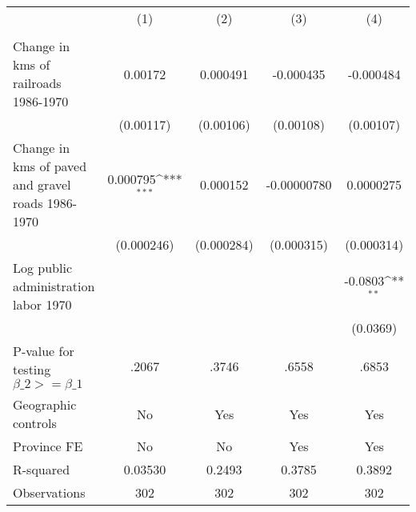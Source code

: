 {
\def\sym#1{\ifmmode^{#1}\else\(^{#1}\)\fi}
\begin{tabular}{l*{4}{c}}
\hline\hline
                &\multicolumn{1}{c}{(1)}&\multicolumn{1}{c}{(2)}&\multicolumn{1}{c}{(3)}&\multicolumn{1}{c}{(4)}\\
                &\multicolumn{1}{c}{}&\multicolumn{1}{c}{}&\multicolumn{1}{c}{}&\multicolumn{1}{c}{}\\
\hline
Change in kms of railroads 1986-1970&  0.00172         & 0.000491         &-0.000435         &-0.000484         \\
                &(0.00117)         &(0.00106)         &(0.00108)         &(0.00107)         \\
[1em]
Change in kms of paved and gravel roads 1986-1970& 0.000795\sym{***}& 0.000152         &-0.00000780         &0.0000275         \\
                &(0.000246)         &(0.000284)         &(0.000315)         &(0.000314)         \\
[1em]
Log public administration labor 1970&                  &                  &                  &  -0.0803\sym{**} \\
                &                  &                  &                  & (0.0369)         \\
\hline
P-value for testing $\beta\_{2} >= \beta\_{1}$&    .2067         &    .3746         &    .6558         &    .6853         \\
Geographic controls&       No         &      Yes         &      Yes         &      Yes         \\
Province FE     &       No         &       No         &      Yes         &      Yes         \\
R-squared       &  0.03530         &   0.2493         &   0.3785         &   0.3892         \\
Observations    &      302         &      302         &      302         &      302         \\
\hline\hline
\end{tabular}
}
